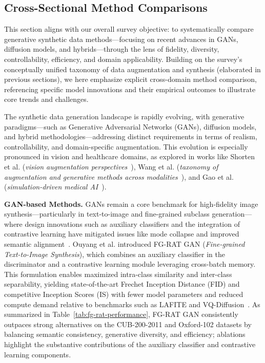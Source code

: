 \documentclass[sigconf]{acmart}
\begin{document}
\subsection{Cross-Sectional Method Comparisons}

This section aligns with our overall survey objective: to systematically compare generative synthetic data methods—focusing on recent advances in GANs, diffusion models, and hybrids—through the lens of fidelity, diversity, controllability, efficiency, and domain applicability. Building on the survey's conceptually unified taxonomy of data augmentation and synthesis (elaborated in previous sections), we here emphasize explicit cross-domain method comparison, referencing specific model innovations and their empirical outcomes to illustrate core trends and challenges.

The synthetic data generation landscape is rapidly evolving, with generative paradigms—such as Generative Adversarial Networks (GANs), diffusion models, and hybrid methodologies—addressing distinct requirements in terms of realism, controllability, and domain-specific augmentation. This evolution is especially pronounced in vision and healthcare domains, as explored in works like Shorten et al. (\textit{vision augmentation perspectives}~\cite{ref61}), Wang et al. (\textit{taxonomy of augmentation and generative methods across modalities}~\cite{ref64}), and Gao et al. (\textit{simulation-driven medical AI}~\cite{ref81}). 

\textbf{GAN-based Methods.} GANs remain a core benchmark for high-fidelity image synthesis—particularly in text-to-image and fine-grained subclass generation—where design innovations such as auxiliary classifiers and the integration of contrastive learning have mitigated issues like mode collapse and improved semantic alignment~\cite{ref90,ref91,ref101,ref102}. Ouyang et al. introduced FG-RAT GAN (\textit{Fine-grained Text-to-Image Synthesis}), which combines an auxiliary classifier in the discriminator and a contrastive learning module leveraging cross-batch memory. This formulation enables maximized intra-class similarity and inter-class separability, yielding state-of-the-art Frechet Inception Distance (FID) and competitive Inception Scores (IS) with fewer model parameters and reduced compute demand relative to benchmarks such as LAFITE and VQ-Diffusion~\cite{ref101}. As summarized in Table~\ref{tab:fg-rat-performance}, FG-RAT GAN consistently outpaces strong alternatives on the CUB-200-2011 and Oxford-102 datasets by balancing semantic consistency, generative diversity, and efficiency; ablations highlight the substantive contributions of the auxiliary classifier and contrastive learning components.
\end{document}
